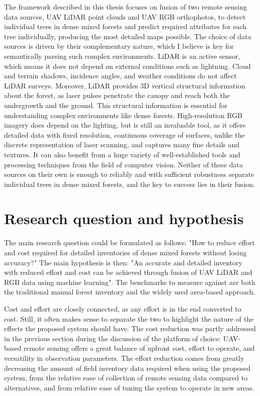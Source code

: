 The framework described in this thesis focuses on fusion of two remote sensing data sources, UAV LiDAR point clouds and UAV RGB orthophotos, to detect individual trees in dense mixed forests and predict required attributes for each tree individually, producing the most detailed maps possible.
The choice of data sources is driven by their complementary nature, which I believe is key for semantically parsing such complex environments.
LiDAR is an active sensor, which means it does not depend on external conditions such as lightning.
Cloud and terrain shadows, incidence angles, and weather conditions do not affect LiDAR surveys.
Moreover, LiDAR provides 3D vertical structural information about the forest, as laser pulses penetrate the canopy and reach both the undergrowth and the ground.
This structural information is essential for understanding complex environments like dense forests.
High-resolution RGB imagery does depend on the lighting, but is still an invaluable tool, as it offers detailed data with fixed resolution, continuous coverage of surfaces, unlike the discrete representation of laser scanning, and captures many fine details and textures.
It can also benefit from a huge variety of well-established tools and processing techniques from the field of computer vision.
Neither of these data sources on their own is enough to reliably and with sufficient robustness separate individual trees in dense mixed forests, and the key to success lies in their fusion.

\section{Research question and hypothesis}\label{sec-research-question}

The main research question could be formulated as follows: "How to reduce effort and cost required for detailed inventories of dense mixed forests without losing accuracy?"
The main hypothesis is then: "An accurate and detailed inventory with reduced effort and cost can be achieved through fusion of UAV LiDAR and RGB data using machine learning".
The benchmarks to measure against are both the traditional manual forest inventory and the widely used area-based approach.

Cost and effort are closely connected, as any effort is in the end converted to cost.
Still, it often makes sense to separate the two to highlight the nature of the effects the proposed system should have.
The cost reduction was partly addressed in the previous section during the discussion of the platform of choice: UAV-based remote sensing offers a great balance of upfront cost, effort to operate, and versatility in observation parameters.
The effort reduction comes from greatly decreasing the amount of field inventory data required when using the proposed system, from the relative ease of collection of remote sensing data compared to alternatives, and from relative ease of tuning the system to operate in new areas.

